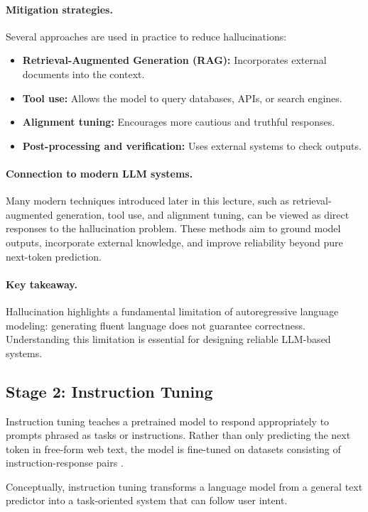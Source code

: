 \documentclass{article}
\begin{document}
\paragraph{Mitigation strategies.}
Several approaches are used in practice to reduce hallucinations:
\begin{itemize}
    \item \textbf{Retrieval-Augmented Generation (RAG):} Incorporates external documents into the context.
    \item \textbf{Tool use:} Allows the model to query databases, APIs, or search engines.
    \item \textbf{Alignment tuning:} Encourages more cautious and truthful responses.
    \item \textbf{Post-processing and verification:} Uses external systems to check outputs.
\end{itemize}

\paragraph{Connection to modern LLM systems.}
Many modern techniques introduced later in this lecture, such as retrieval-augmented generation, tool use, and alignment tuning, can be viewed as direct responses to the hallucination problem. These methods aim to ground model outputs, incorporate external knowledge, and improve reliability beyond pure next-token prediction.

\paragraph{Key takeaway.}
Hallucination highlights a fundamental limitation of autoregressive language modeling: generating fluent language does not guarantee correctness. Understanding this limitation is essential for designing reliable LLM-based systems.

\subsection{Stage 2: Instruction Tuning}

Instruction tuning teaches a pretrained model to respond appropriately to prompts phrased as tasks or instructions. Rather than only predicting the next token in free-form web text, the model is fine-tuned on datasets consisting of instruction-response pairs \cite{wei2021finetuned,longpre2023flan}.

Conceptually, instruction tuning transforms a language model from a general text predictor into a task-oriented system that can follow user intent.
\end{document}
